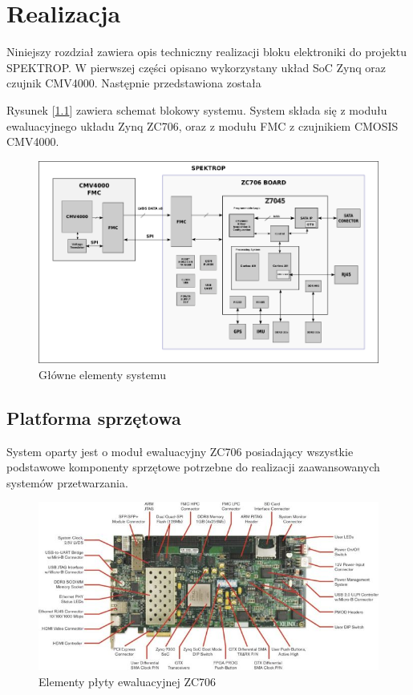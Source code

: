 \documentclass[a4paper,11pt,oneside]{report}  %
\begin{document}
\chapter{Realizacja}
Niniejszy rozdział zawiera opis techniczny realizacji bloku elektroniki do projektu SPEKTROP. W pierwszej części opisano wykorzystany układ SoC Zynq oraz czujnik CMV4000. Następnie przedstawiona została 

Rysunek [\ref{fig:OVER}] zawiera schemat blokowy systemu. System składa się z modułu ewaluacyjnego układu Zynq ZC706, oraz z modułu FMC z czujnikiem CMOSIS CMV4000.

\begin{figure}[!h]
	\centering
	\includegraphics[width=17cm]{systembnw2.png}
	\caption{Główne elementy systemu}
	\label{fig:OVER}
\end{figure}

\section{Platforma sprzętowa}
System oparty jest o moduł ewaluacyjny ZC706 posiadający wszystkie podstawowe komponenty sprzętowe potrzebne do realizacji zaawansowanych systemów przetwarzania.

\begin{figure}[!h]
	\centering
	\includegraphics[width=13cm]{zc706-base-board.jpg}
	\caption{Elementy płyty ewaluacyjnej ZC706}
	\label{fig:ZC706}
\end{figure}
\end{document}

